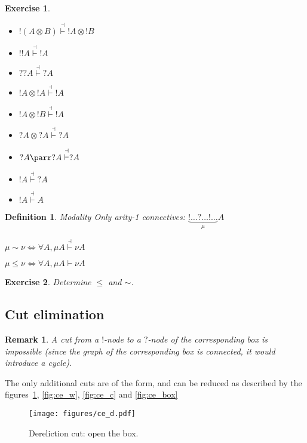 \documentclass[a4paper,10pt]{article}
\newtheorem{definition}{Definition}
\newtheorem{exo}{Exercise}
\newtheorem{rmk}{Remark}
\begin{document}
	\begin{exo}
		\begin{multicols}{2}
		\begin{itemize}
			\item $!(A\otimes B)\overset{\dashv}{\vdash} !A \otimes !B$
			\item $!!A \overset{\dashv}{\vdash} !A$
			\item $??A \overset{\dashv}{\vdash} ?A$
			\item $!A \otimes !A\overset{\dashv}{\vdash} !A$
			\item $!A \otimes !B\overset{\dashv}{\vdash} !A$
			\item $?A \otimes ?A\overset{\dashv}{\vdash}?A$
			\item $?A \parr ?A\overset{\dashv}{\vdash}?A$
			\item $!A\overset{\dashv}{\vdash}?A$
			\item $!A\overset{\dashv}{\vdash}A$
		\end{itemize}	
		\end{multicols}
	\end{exo}	
	
	\begin{definition}{Modality}
		Only arity-1 connectives: $\underset{\mu}{\underbrace{!\dots ?\dots ! \dots}}A$
		
		$\mu \sim \nu \Leftrightarrow \forall A, \mu A \overset{\dashv}{\vdash} \nu A$
		
		$\mu \le \nu \Leftrightarrow \forall A, \mu A \vdash \nu A$
	\end{definition}	
	
	\begin{exo}
		Determine $\le$ and $\sim$.
	\end{exo}
	
	\subsection{Cut elimination}
	\begin{rmk}
		A cut from a $!$-node to a $?$-node of the corresponding box is impossible (since the graph of the corresponding box is connected, it would introduce a cycle).
		\end{rmk}		
	The only additional cuts are of the form, and can be reduced as described by the figures~\ref{fig:ce_d}, \ref{fig:ce_w}, \ref{fig:ce_c} and \ref{fig:ce_box}
	
	\begin{figure}[!h]
	\begin{center}	
		\texttt{[image: figures/ce\_d.pdf]}
		\caption{Dereliction cut: open the box.}
		\label{fig:ce_d}
	\end{center}	
	\end{figure}	
	
\end{document}
